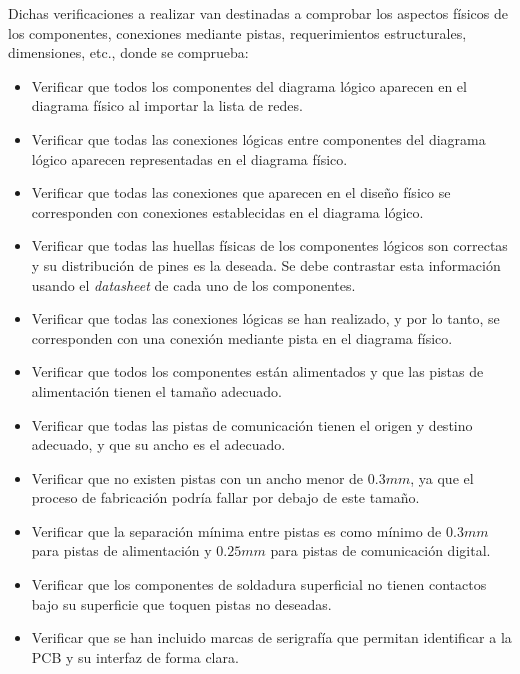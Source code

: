Dichas verificaciones a realizar van destinadas a comprobar los aspectos físicos de los componentes, conexiones mediante pistas, requerimientos estructurales, dimensiones, etc., donde se comprueba:
\begin{itemize}
    \item Verificar que todos los componentes del diagrama lógico aparecen en el diagrama físico al importar la lista de redes.
    
    \item Verificar que todas las conexiones lógicas entre componentes del diagrama lógico aparecen representadas en el diagrama físico.
    
    \item Verificar que todas las conexiones que aparecen en el diseño físico se corresponden con conexiones establecidas en el diagrama lógico.
    
    \item Verificar que todas las huellas físicas de los componentes lógicos son correctas y su distribución de pines es la deseada. Se debe contrastar esta información usando el \textit{datasheet} de cada uno de los componentes.
    
    \item Verificar que todas las conexiones lógicas se han realizado, y por lo tanto, se corresponden con una conexión mediante pista en el diagrama físico.
    
    \item Verificar que todos los componentes están alimentados y que las pistas de alimentación tienen el tamaño adecuado.
    
    \item Verificar que todas las pistas de comunicación tienen el origen y destino adecuado, y que su ancho es el adecuado.
    
    \item Verificar que no existen pistas con un ancho menor de $0.3mm$, ya que el proceso de fabricación podría fallar por debajo de este tamaño.
    
    \item Verificar que la separación mínima entre pistas es como mínimo de $0.3mm$ para pistas de alimentación y $0.25mm$ para pistas de comunicación digital.
    
    \item Verificar que los componentes de soldadura superficial no tienen contactos bajo su superficie que toquen pistas no deseadas.
    
    \item Verificar que se han incluido marcas de serigrafía que permitan identificar a la \ac{PCB} y su interfaz de forma clara.
    

\end{itemize}
